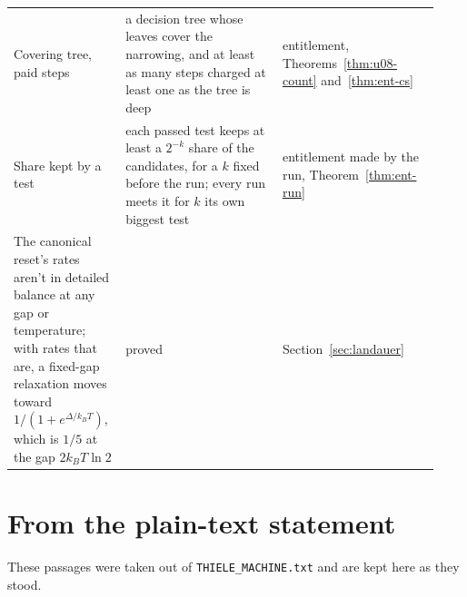 \documentclass[11pt,twoside]{article}
\theoremstyle{thielethm}
\theoremstyle{thieledef}
\theoremstyle{thieledef}
\theoremstyle{thieledef}
\theoremstyle{thielethm}
\theoremstyle{thieleobs}
\theoremstyle{thielethm}
\begin{document}
\begin{longtable}{@{}>{\raggedright\arraybackslash}p{0.242\linewidth}>{\raggedright\arraybackslash}p{0.344\linewidth}>{\raggedright\arraybackslash}p{0.344\linewidth}@{}}
Covering tree, paid steps & a decision tree whose leaves cover the narrowing, and at least as many steps charged at least one as the tree is deep & entitlement, Theorems~\ref{thm:u08-count} and~\ref{thm:ent-cs} \\
Share kept by a test & each passed test keeps at least a $2^{-k}$ share of the candidates, for a $k$ fixed before the run; every run meets it for $k$ its own biggest test & entitlement made by the run, Theorem~\ref{thm:ent-run} \\
The canonical reset's rates aren't in detailed balance at any gap or temperature; with rates that are, a fixed-gap relaxation moves toward $1/(1 + e^{\Delta/k_B T})$, which is $1/5$ at the gap $2 k_B T \ln 2$ & proved  & Section~\ref{sec:landauer} \\
\end{longtable}
\endgroup

\section{From the plain-text statement}

These passages were taken out of \texttt{THIELE\_MACHINE.txt} and are kept here as they stood.
\end{document}
